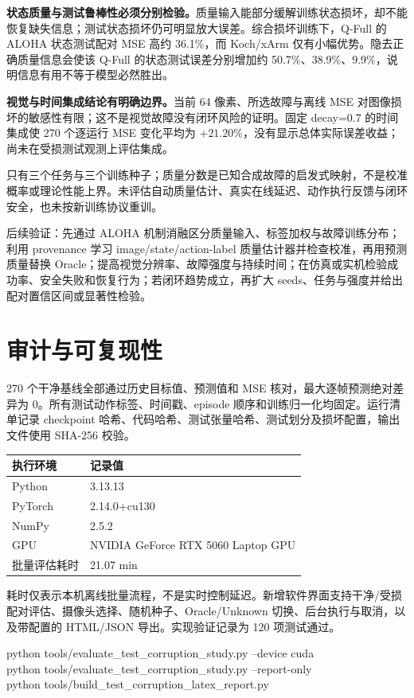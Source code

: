 \documentclass[11pt,a4paper,fontset=fandol]{ctexart}
\newcommand{\note}[1]{\begin{tcolorbox}[colback=panel,colframe=rule,boxrule=0.5pt,arc=1mm]#1\end{tcolorbox}}
\begin{document}
\textbf{状态质量与测试鲁棒性必须分别检验。}质量输入能部分缓解训练状态损坏，却不能恢复缺失信息；测试状态损坏仍可明显放大误差。综合损坏训练下，Q-Full 的 ALOHA 状态测试配对 MSE 高约 36.1\%，而 Koch/xArm 仅有小幅优势。隐去正确质量信息会使该 Q-Full 的状态测试误差分别增加约 50.7\%、38.9\%、9.9\%，说明信息有用不等于模型必然胜出。

\textbf{视觉与时间集成结论有明确边界。}当前 64 像素、所选故障与离线 MSE 对图像损坏的敏感性有限；这不是视觉故障没有闭环风险的证明。固定 decay=0.7 的时间集成使 270 个逐运行 MSE 变化平均为 $+21.20\%$，没有显示总体实际误差收益；尚未在受损测试观测上评估集成。

只有三个任务与三个训练种子；质量分数是已知合成故障的启发式映射，不是校准概率或理论性能上界。未评估自动质量估计、真实在线延迟、动作执行反馈与闭环安全，也未按新训练协议重训。

\note{后续验证：先通过 ALOHA 机制消融区分质量输入、标签加权与故障训练分布；利用 provenance 学习 image/state/action-label 质量估计器并检查校准，再用预测质量替换 Oracle；提高视觉分辨率、故障强度与持续时间；在仿真或实机检验成功率、安全失败和恢复行为；若闭环趋势成立，再扩大 seeds、任务与强度并给出配对置信区间或显著性检验。}
\clearpage\section{审计与可复现性}
270 个干净基线全部通过历史目标值、预测值和 MSE 核对，最大逐帧预测绝对差异为 0。所有测试动作标签、时间戳、episode 顺序和训练归一化均固定。运行清单记录 checkpoint 哈希、代码哈希、测试张量哈希、测试划分及损坏配置，输出文件使用 SHA-256 校验。

\begin{center}
\small
\begin{tabular}{lp{102mm}}
\toprule
执行环境 & 记录值 \\
\midrule
Python & 3.13.13 \\
PyTorch & 2.14.0+cu130 \\
NumPy & 2.5.2 \\
GPU & NVIDIA GeForce RTX 5060 Laptop GPU \\
批量评估耗时 & 21.07 min \\
\bottomrule
\end{tabular}
\end{center}
耗时仅表示本机离线批量流程，不是实时控制延迟。新增软件界面支持干净/受损配对评估、摄像头选择、随机种子、Oracle/Unknown 切换、后台执行与取消，以及带配置的 HTML/JSON 导出。实现验证记录为 120 项测试通过。

\begin{tcolorbox}[colback=panel,colframe=rule]\small\ttfamily
python tools/evaluate\_test\_corruption\_study.py --device cuda\\
python tools/evaluate\_test\_corruption\_study.py --report-only\\
python tools/build\_test\_corruption\_latex\_report.py
\end{tcolorbox}
\end{document}
